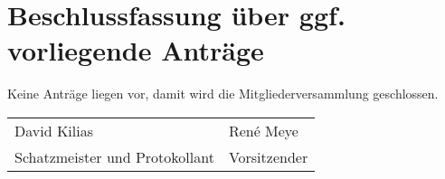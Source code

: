 \documentclass[a4paper,12pt,titlepage]{scrartcl}
\begin{document}
\section{Beschlussfassung über ggf. vorliegende Anträge}
Keine Anträge liegen vor, damit wird die Mitgliederversammlung geschlossen.

\nopagebreak
\vspace{10\baselineskip}
\begin{tabularx}{\textwidth}[b]{X X}
	\hline
	David Kilias & René Meye \\
	Schatzmeister und Protokollant & Vorsitzender
\end{tabularx}

\appendix

\end{document}
